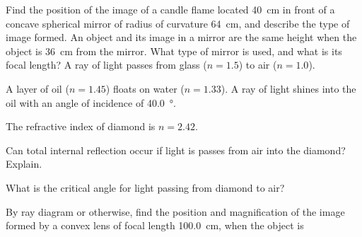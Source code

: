\documentclass[a4paper]{exam}
\begin{document}
\begin{questions}
    \question Find the position of the image of a candle flame located \SI{40}{\centi\metre} in
              front of a concave spherical mirror of radius of curvature \SI{64}{\centi\metre},
              and describe the type of image formed.
    \question An object and its image in a mirror are the same height when the object is \SI{36}{\centi\metre}
              from the mirror. What type of mirror is used, and what is its focal length?
    \question A ray of light passes from glass ($ n = 1.5 $) to air ($ n = 1.0 $).
    \question A layer of oil ($ n = 1.45 $) floats on water ($ n = 1.33 $). A ray of light shines into the oil
              with an angle of incidence of \SI{40.0}{\degree}.
    \question The refractive index of diamond is $ n = 2.42 $.
      \begin{parts}
        \item Can total internal reflection occur if light is passes from air into the diamond? Explain.
        \item What is the critical angle for light passing from diamond to air?
      \end{parts}
    \question By ray diagram or otherwise, find the position and magnification of the image formed by a convex lens of
              focal length \SI{100.0}{\centi\metre}, when the object is
      \begin{parts}

\end{parts}
\end{questions}
\end{document}
